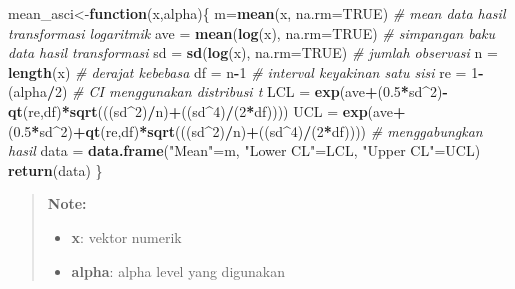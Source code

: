 \documentclass[]{book}
\newenvironment{Shaded}{\begin{snugshade}}{\end{snugshade}}
\newcommand{\KeywordTok}[1]{\textcolor[rgb]{0.13,0.29,0.53}{\textbf{#1}}}
\newcommand{\DataTypeTok}[1]{\textcolor[rgb]{0.13,0.29,0.53}{#1}}
\newcommand{\DecValTok}[1]{\textcolor[rgb]{0.00,0.00,0.81}{#1}}
\newcommand{\FloatTok}[1]{\textcolor[rgb]{0.00,0.00,0.81}{#1}}
\newcommand{\StringTok}[1]{\textcolor[rgb]{0.31,0.60,0.02}{#1}}
\newcommand{\CommentTok}[1]{\textcolor[rgb]{0.56,0.35,0.01}{\textit{#1}}}
\newcommand{\OtherTok}[1]{\textcolor[rgb]{0.56,0.35,0.01}{#1}}
\newcommand{\ControlFlowTok}[1]{\textcolor[rgb]{0.13,0.29,0.53}{\textbf{#1}}}
\newcommand{\OperatorTok}[1]{\textcolor[rgb]{0.81,0.36,0.00}{\textbf{#1}}}
\newcommand{\NormalTok}[1]{#1}
\providecommand{\tightlist}{%
  \setlength{\itemsep}{0pt}\setlength{\parskip}{0pt}}
\begin{document}
\begin{Shaded}
\begin{Highlighting}[]
\NormalTok{mean_asci<-}\ControlFlowTok{function}\NormalTok{(x,alpha)\{}
\NormalTok{  m=}\KeywordTok{mean}\NormalTok{(x, }\DataTypeTok{na.rm=}\OtherTok{TRUE}\NormalTok{)}
  \CommentTok{# mean data hasil transformasi logaritmik}
\NormalTok{  ave =}\StringTok{ }\KeywordTok{mean}\NormalTok{(}\KeywordTok{log}\NormalTok{(x), }\DataTypeTok{na.rm=}\OtherTok{TRUE}\NormalTok{)}
  \CommentTok{# simpangan baku data hasil transformasi}
\NormalTok{  sd =}\StringTok{ }\KeywordTok{sd}\NormalTok{(}\KeywordTok{log}\NormalTok{(x), }\DataTypeTok{na.rm=}\OtherTok{TRUE}\NormalTok{)}
  \CommentTok{# jumlah observasi}
\NormalTok{  n =}\StringTok{ }\KeywordTok{length}\NormalTok{(x)}
  \CommentTok{# derajat kebebasa}
\NormalTok{  df =}\StringTok{ }\NormalTok{n}\OperatorTok{-}\DecValTok{1}
  \CommentTok{# interval keyakinan satu sisi}
\NormalTok{  re =}\StringTok{ }\DecValTok{1}\OperatorTok{-}\NormalTok{(alpha}\OperatorTok{/}\DecValTok{2}\NormalTok{)}
  \CommentTok{# CI menggunakan distribusi t}
\NormalTok{  LCL =}\StringTok{ }\KeywordTok{exp}\NormalTok{(ave}\OperatorTok{+}\NormalTok{(}\FloatTok{0.5}\OperatorTok{*}\NormalTok{sd}\OperatorTok{^}\DecValTok{2}\NormalTok{)}\OperatorTok{-}\KeywordTok{qt}\NormalTok{(re,df)}\OperatorTok{*}\KeywordTok{sqrt}\NormalTok{(((sd}\OperatorTok{^}\DecValTok{2}\NormalTok{)}\OperatorTok{/}\NormalTok{n)}\OperatorTok{+}\NormalTok{((sd}\OperatorTok{^}\DecValTok{4}\NormalTok{)}\OperatorTok{/}\NormalTok{(}\DecValTok{2}\OperatorTok{*}\NormalTok{df))))}
\NormalTok{  UCL =}\StringTok{ }\KeywordTok{exp}\NormalTok{(ave}\OperatorTok{+}\NormalTok{(}\FloatTok{0.5}\OperatorTok{*}\NormalTok{sd}\OperatorTok{^}\DecValTok{2}\NormalTok{)}\OperatorTok{+}\KeywordTok{qt}\NormalTok{(re,df)}\OperatorTok{*}\KeywordTok{sqrt}\NormalTok{(((sd}\OperatorTok{^}\DecValTok{2}\NormalTok{)}\OperatorTok{/}\NormalTok{n)}\OperatorTok{+}\NormalTok{((sd}\OperatorTok{^}\DecValTok{4}\NormalTok{)}\OperatorTok{/}\NormalTok{(}\DecValTok{2}\OperatorTok{*}\NormalTok{df))))}
  \CommentTok{# menggabungkan hasil}
\NormalTok{  data =}\StringTok{ }\KeywordTok{data.frame}\NormalTok{(}\StringTok{"Mean"}\NormalTok{=m,}
                  \StringTok{"Lower CL"}\NormalTok{=LCL,}
                  \StringTok{"Upper CL"}\NormalTok{=UCL)}
  \KeywordTok{return}\NormalTok{(data)}
\NormalTok{\}}
\end{Highlighting}
\end{Shaded}

\begin{quote}
\textbf{Note: }

\begin{itemize}
\tightlist
\item
  \textbf{x}: vektor numerik
\item
  \textbf{alpha}: alpha level yang digunakan
\end{itemize}
\end{quote}
\end{document}
